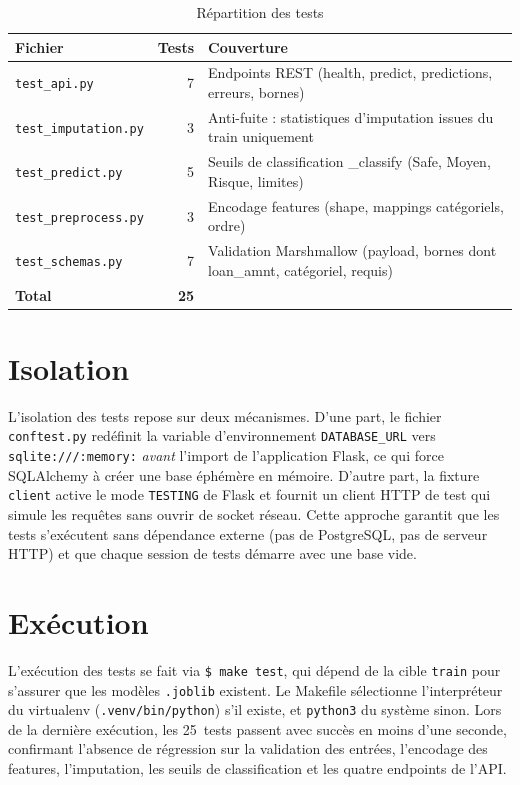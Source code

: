 \documentclass[12pt,a4paper,openany]{report}
\newcommand{\file}[1]{\texttt{#1}}
\newcommand{\cmd}[1]{\texttt{\$ #1}}
\begin{document}
\begin{table}[H]
    \centering
    \caption{Répartition des tests}
    \label{tab:tests}
    \begin{tabularx}{\textwidth}{l r X}
        \toprule
        \textbf{Fichier} & \textbf{Tests} & \textbf{Couverture} \\
        \midrule
        \file{test\_api.py}        & 7 & Endpoints REST (health, predict, predictions, erreurs, bornes) \\
        \file{test\_imputation.py} & 3 & Anti-fuite : statistiques d'imputation issues du train uniquement \\
        \file{test\_predict.py}    & 5 & Seuils de classification \_classify (Safe, Moyen, Risque, limites) \\
        \file{test\_preprocess.py} & 3 & Encodage features (shape, mappings catégoriels, ordre) \\
        \file{test\_schemas.py}    & 7 & Validation Marshmallow (payload, bornes dont loan\_amnt, catégoriel, requis) \\
        \midrule
        \textbf{Total}             & \textbf{25} & \\
        \bottomrule
    \end{tabularx}
\end{table}

\section{Isolation}

L'isolation des tests repose sur deux mécanismes. D'une part, le fichier \file{conftest.py} redéfinit la variable d'environnement \texttt{DATABASE\_URL} vers \texttt{sqlite:///:memory:} \emph{avant} l'import de l'application Flask, ce qui force SQLAlchemy à créer une base éphémère en mémoire. D'autre part, la fixture \texttt{client} active le mode \texttt{TESTING} de Flask et fournit un client HTTP de test qui simule les requêtes sans ouvrir de socket réseau. Cette approche garantit que les tests s'exécutent sans dépendance externe (pas de PostgreSQL, pas de serveur HTTP) et que chaque session de tests démarre avec une base vide.

\section{Exécution}

L'exécution des tests se fait via \cmd{make test}, qui dépend de la cible \texttt{train} pour s'assurer que les modèles \texttt{.joblib} existent. Le Makefile sélectionne l'interpréteur du virtualenv (\texttt{.venv/bin/python}) s'il existe, et \texttt{python3} du système sinon. Lors de la dernière exécution, les 25~tests passent avec succès en moins d'une seconde, confirmant l'absence de régression sur la validation des entrées, l'encodage des features, l'imputation, les seuils de classification et les quatre endpoints de l'API.
\end{document}
